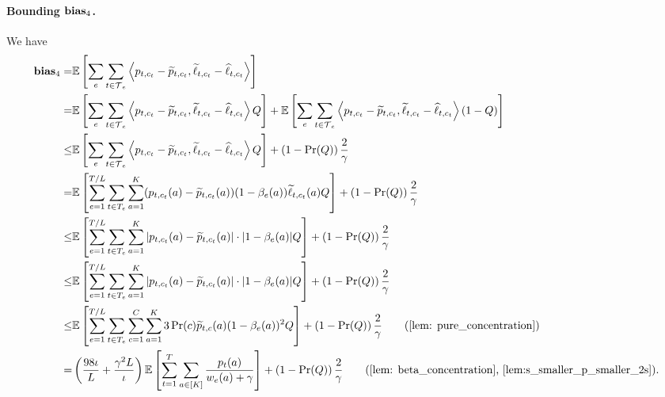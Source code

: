 \paragraph{Bounding $\mathbf{bias}_{4}$.} We have
\begin{align*}
\bias{4} =& \mathbb{E} \left[ \sum_e \sum_{t \in \Time_e} \ip{p_{t,c_t} - \widetilde{p}_{t,c_t}, \widetilde{\ell}_{t,c_t} - \widehat{\ell}_{t,c_t}} \right] \\
%
=& \mathbb{E} \left[ \sum_e \sum_{t \in \Time_e} \ip{p_{t,c_t} - \widetilde{p}_{t,c_t}, \widetilde{\ell}_{t,c_t} - \widehat{\ell}_{t,c_t}} Q \right] + \mathbb{E} \left[ \sum_e \sum_{t \in \Time_e} \ip{p_{t,c_t} - \widetilde{p}_{t,c_t}, \widetilde{\ell}_{t,c_t} - \widehat{\ell}_{t,c_t}} (1-Q) \right]\\
%
\le& \mathbb{E} \left[ \sum_e \sum_{t \in \Time_e} \ip{p_{t,c_t} - \widetilde{p}_{t,c_t}, \widetilde{\ell}_{t,c_t} - \widehat{\ell}_{t,c_t}} Q \right] + \left(1-\Pr(Q)\right) \frac{2}{\gamma}\\
%
=& \mathbb{E} \left[ \sum_{e=1}^{T/L} \sum_{t \in T_e} \sum_{a=1}^{K} (p_{t,c_t}(a) - \widetilde{p}_{t,c_t}(a))(1 - \beta_{e}(a)) \widetilde{\ell}_{t,c_t}(a) Q\right] + \left(1-\Pr(Q)\right) \frac{2}{\gamma}\\
%
\le& \mathbb{E} \left[ \sum_{e=1}^{T/L} \sum_{t \in T_e} \sum_{a=1}^{K} |p_{t,c_t}(a) - \widetilde{p}_{t,c_t}(a)| \cdot |1 - \beta_{e}(a)| Q \right]  + \left(1-\Pr(Q)\right) \frac{2}{\gamma}\\
%
\le& \mathbb{E} \left[ \sum_{e=1}^{T/L} \sum_{t \in T_e} \sum_{a=1}^{K} |p_{t,c_t}(a) - \widetilde{p}_{t,c_t}(a)| \cdot |1 - \beta_{e}(a)| Q \right]  + \left(1-\Pr(Q)\right) \frac{2}{\gamma} \\
%
\le& \mathbb{E} \left[ \sum_{e=1}^{T/L} \sum_{t \in T_e} \sum_{c=1}^{C} \sum_{a=1}^{K} 3 \Pr(c) \widetilde{p}_{t,c}(a)(1 - \beta_{e}(a))^2 Q \right] +  \left(1-\Pr(Q)\right) \frac{2}{\gamma} \tag{\Cref{lem: pure_concentration}}\\ 
%
=& \left(\frac{98 \iota}{L}  + \frac{\gamma^2 L }{\iota} \right) \E\left[\sum^T_{t=1} \sum_{a\in[K]} \frac{p_t(a)}{w_e(a)+ \gamma} \right] +  \left(1-\Pr(Q)\right) \frac{2}{\gamma} \tag{\Cref{lem: beta_concentration}, \Cref{lem:s_smaller_p_smaller_2s}}. 
\end{align*}

